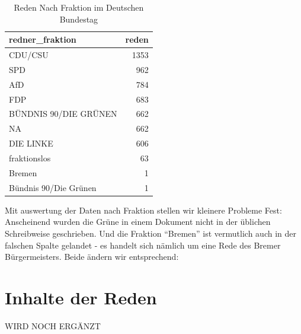 \documentclass[oneside, 12pt, numbers=endperiod]{scrbook}
\newenvironment{Shaded}{\begin{snugshade}}{\end{snugshade}}
\newcommand{\DataTypeTok}[1]{\textcolor[rgb]{0.13,0.29,0.53}{#1}}
\newcommand{\DecValTok}[1]{\textcolor[rgb]{0.00,0.00,0.81}{#1}}
\newcommand{\KeywordTok}[1]{\textcolor[rgb]{0.13,0.29,0.53}{\textbf{#1}}}
\newcommand{\NormalTok}[1]{#1}
\newcommand{\OperatorTok}[1]{\textcolor[rgb]{0.81,0.36,0.00}{\textbf{#1}}}
\newcommand{\StringTok}[1]{\textcolor[rgb]{0.31,0.60,0.02}{#1}}
\theoremstyle{definition}
\theoremstyle{definition}
\theoremstyle{definition}
\theoremstyle{remark}
\begin{document}
\begin{table}

\caption{\label{tab:unnamed-chunk-18}Reden Nach Fraktion im Deutschen Bundestag}
\centering
\begin{tabular}[t]{lr}
\toprule
redner\_fraktion & reden\\
\midrule
CDU/CSU & 1353\\
SPD & 962\\
AfD & 784\\
FDP & 683\\
BÜNDNIS 90/DIE GRÜNEN & 662\\
\addlinespace
NA & 662\\
DIE LINKE & 606\\
fraktionslos & 63\\
Bremen & 1\\
Bündnis 90/Die Grünen & 1\\
\bottomrule
\end{tabular}
\end{table}

Mit auswertung der Daten nach Fraktion stellen wir kleinere Probleme
Fest: Anscheinend wurden die Grüne in einem Dokument nicht in der
üblichen Schreibweise geschrieben. Und die Fraktion ``Bremen'' ist
vermutlich auch in der falschen Spalte gelandet - es handelt sich
nämlich um eine Rede des Bremer Bürgermeisters. Beide ändern wir
entsprechend:

\begin{Shaded}
\end{Shaded}

\hypertarget{inhalte-der-reden}{%
\section{Inhalte der Reden}\label{inhalte-der-reden}}

WIRD NOCH ERGÄNZT
\end{document}
